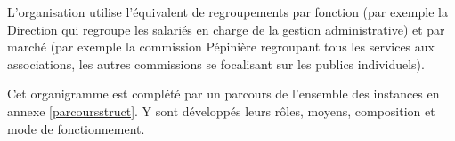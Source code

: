 L'organisation utilise l'équivalent de regroupements par fonction (par exemple
la Direction qui regroupe les salariés en charge de la gestion administrative)
et par marché (par exemple la commission Pépinière regroupant tous les services
aux associations, les autres commissions se focalisant sur les publics
individuels).

Cet organigramme est complété par un parcours de l'ensemble des instances en
annexe \ref{parcoursstruct}. Y sont développés leurs rôles, moyens,
composition et mode de fonctionnement.

\label{api}
\label{ene}
